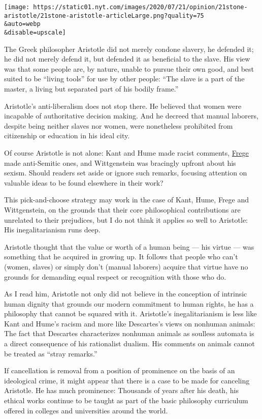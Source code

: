 \texttt{[image: https://static01.nyt.com/images/2020/07/21/opinion/21stone-aristotle/21stone-aristotle-articleLarge.png?quality=75\\\&auto=webp\\\&disable=upscale]}

The Greek philosopher Aristotle did not merely condone slavery, he
defended it; he did not merely defend it, but defended it as beneficial
to the slave. His view was that some people are, by nature, unable to
pursue their own good, and best suited to be ``living tools'' for use by
other people: ``The slave is a part of the master, a living but
separated part of his bodily frame.''

Aristotle's anti-liberalism does not stop there. He believed that women
were incapable of authoritative decision making. And he decreed that
manual laborers, despite being neither slaves nor women, were
nonetheless prohibited from citizenship or education in his ideal city.

Of course Aristotle is not alone: Kant and Hume made racist comments,
\href{https://plato.stanford.edu/entries/frege/}{Frege} made
anti-Semitic ones, and Wittgenstein was bracingly upfront about his
sexism. Should readers set aside or ignore such remarks, focusing
attention on valuable ideas to be found elsewhere in their work?

This pick-and-choose strategy may work in the case of Kant, Hume, Frege
and Wittgenstein, on the grounds that their core philosophical
contributions are unrelated to their prejudices, but I do not think it
applies so well to Aristotle: His inegalitarianism runs deep.

Aristotle thought that the value or worth of a human being --- his
virtue --- was something that he acquired in growing up. It follows that
people who can't (women, slaves) or simply don't (manual laborers)
acquire that virtue have no grounds for demanding equal respect or
recognition with those who do.

As I read him, Aristotle not only did not believe in the conception of
intrinsic human dignity that grounds our modern commitment to human
rights, he has a philosophy that cannot be squared with it. Aristotle's
inegalitarianism is less like Kant and Hume's racism and more like
Descartes's views on nonhuman animals: The fact that Descartes
characterizes nonhuman animals as soulless automata is a direct
consequence of his rationalist dualism. His comments on animals cannot
be treated as ``stray remarks.''

If cancellation is removal from a position of prominence on the basis of
an ideological crime, it might appear that there is a case to be made
for canceling Aristotle. He has much prominence: Thousands of years
after his death, his ethical works continue to be taught as part of the
basic philosophy curriculum offered in colleges and universities around
the world.


